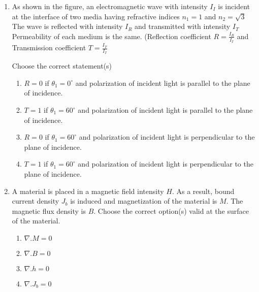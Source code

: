 \documentclass[journal]{IEEEtran}
\begin{document}
\begin{enumerate}[start=14]
    \item As shown in the figure, an electromagnetic wave with intensity $I_{I}$ is incident at the interface of two media having refractive indices $n_{1} = 1$ and $n_{2} = \sqrt{3}$ The wave is reflected with intensity $I_{R}$ and transmitted with intensity $I_{T}$ Permeability of each medium is the same. (Reflection coefficient $R = \frac{I_{R}}{I_{I}}$ and Transmission coefficient $T = \frac{I_{T}}{I_{I}} $
    \begin{figure}[H]
\centering
{}%

\label{fig:my_label}
\end{figure}
    Choose the correct statement(s)
    \begin{enumerate}
        \item $R = 0$ if $\theta_1 = 0^{\circ}$ and polarization of incident light is parallel to the plane of incidence.
         \item $T = 1$ if $\theta_1 = 60^{\circ}$ and polarization of incident light is parallel to the plane of incidence.
         \item $R = 0$ if $\theta_1 = 60^{\circ}$ and polarization of incident light is perpendicular to the plane of incidence.
          \item $T = 1$ if $\theta_1 = 60^{\circ}$ and polarization of incident light is perpendicular
          to the plane of incidence.
    \end{enumerate}

    \item A material is placed in a magnetic field intensity $H$. As a result, bound current density $J_{b}$ is induced and magnetization of the material is $M$. The magnetic flux density is $B$. Choose the correct option(s) valid at the surface of the material.
    \begin{enumerate}
        \item $\nabla . M = 0$
        \item $\nabla . B = 0$
        \item $\nabla . h = 0$
        \item $\nabla . J_b = 0$
    \end{enumerate}


\end{enumerate}
\end{document}
